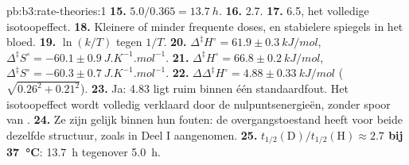 \begin{solution}{pb:b3:rate-theories:1}
\textbf{15.} $5.0/0.365 = \qty{13.7}{h}$.
\textbf{16.} 2.7.
\textbf{17.} 6.5, het volledige isotoopeffect.
\textbf{18.} Kleinere of minder frequente doses, en stabielere spiegels in
het bloed.
\textbf{19.} $\ln(k/T)$ tegen $1/T$.
\textbf{20.} $\Delta^{\ddagger}H^\circ = 61.9 \pm \qty{0.3}{kJ/mol}$, $\Delta^{\ddagger}S^\circ = -60.1 \pm \qty{0.9}{J.K^{-1}.mol^{-1}}$.
\textbf{21.} $\Delta^{\ddagger}H^\circ = 66.8 \pm \qty{0.2}{kJ/mol}$, $\Delta^{\ddagger}S^\circ = -60.3 \pm \qty{0.7}{J.K^{-1}.mol^{-1}}$.
\textbf{22.} $\Delta\Delta^{\ddagger}H^\circ = 4.88 \pm \qty{0.33}{kJ/mol}$ ($\sqrt{0.26^2 + 0.21^2}$).
\textbf{23.} Ja: 4.83 ligt ruim binnen één standaardfout. Het isotoopeffect
wordt volledig verklaard door de nulpuntsenergieën, zonder spoor van
.
\textbf{24.} Ze zijn gelijk binnen hun fouten: de overgangstoestand heeft
voor beide  dezelfde structuur, zoals in Deel I aangenomen.
\textbf{25.} \textbf{$t_{1/2}(\mathrm D)/t_{1/2}(\mathrm H) \approx 2.7$ bij \qty{37}{\celsius}}: \qty{13.7}{h} tegenover \qty{5.0}{h}.
\end{solution}
